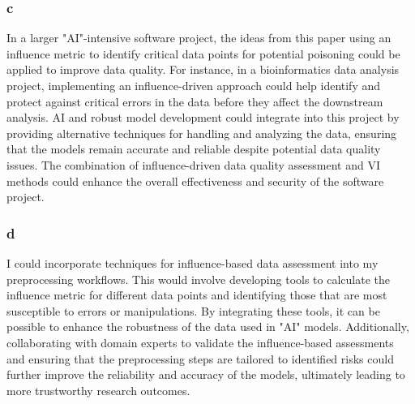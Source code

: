 \documentclass{article}
\begin{document}
\subsubsection{c}
In a larger "AI"-intensive software project, the ideas from this paper using an influence metric to identify critical data points for potential poisoning could be applied to improve data quality. For instance, in a bioinformatics data analysis project, implementing an influence-driven approach could help identify and protect against critical errors in the data before they affect the downstream analysis. AI and robust model development could integrate into this project by providing alternative techniques for handling and analyzing the data, ensuring that the models remain accurate and reliable despite potential data quality issues. The combination of influence-driven data quality assessment and VI methods could enhance the overall effectiveness and security of the software project.

\subsubsection{d}
I could incorporate techniques for influence-based data assessment into my preprocessing workflows. This would involve developing tools to calculate the influence metric for different data points and identifying those that are most susceptible to errors or manipulations. By integrating these tools, it can be possible to enhance the robustness of the data used in "AI" models. Additionally, collaborating with domain experts to validate the influence-based assessments and ensuring that the preprocessing steps are tailored to identified risks could further improve the reliability and accuracy of the models, ultimately leading to more trustworthy research outcomes.
\end{document}
